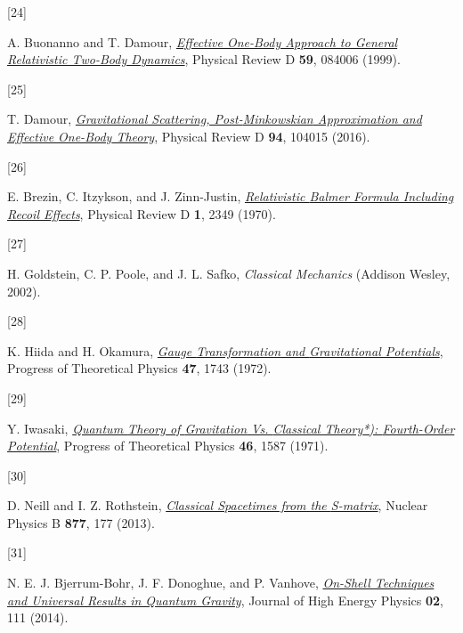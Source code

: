 \documentclass[
  10pt,
  a4paper,
  DIV=11,
  numbers=noendperiod,
  twoside]{scrreprt}
\newlength{\cslhangindent}
\newlength{\csllabelwidth}
\newlength{\cslentryspacingunit} %
\newenvironment{CSLReferences}[2] %
 {%
  \setlength{\parindent}{0pt}
  \ifodd #1
  \let\oldpar\par
  \def\par{\hangindent=\cslhangindent\oldpar}
  \fi
  \setlength{\parskip}{#2\cslentryspacingunit}
 }%
 {}
\newcommand{\CSLLeftMargin}[1]{\parbox[t]{\csllabelwidth}{#1}}
\newcommand{\CSLRightInline}[1]{\parbox[t]{\linewidth - \csllabelwidth}{#1}\break}
\DeclareRobustCommand{\[}{\begin{equation}}
\DeclareRobustCommand{\]}{\end{equation}}
\begin{document}
\begin{CSLReferences}{0}{0}
\leavevmode{}%
\CSLLeftMargin{{[}24{]} }%
\CSLRightInline{A. Buonanno and T. Damour,
\emph{\href{https://doi.org/10.1103/PhysRevD.59.084006}{Effective
One-Body Approach to General Relativistic Two-Body Dynamics}}, Physical
Review D \textbf{59}, 084006 (1999).}

\leavevmode{}%
\CSLLeftMargin{{[}25{]} }%
\CSLRightInline{T. Damour,
\emph{\href{https://doi.org/10.1103/PhysRevD.94.104015}{Gravitational
Scattering, Post-{Minkowskian} Approximation and {Effective One-Body}
Theory}}, Physical Review D \textbf{94}, 104015 (2016).}

\leavevmode{}%
\CSLLeftMargin{{[}26{]} }%
\CSLRightInline{E. Brezin, C. Itzykson, and J. Zinn-Justin,
\emph{\href{https://doi.org/10.1103/PhysRevD.1.2349}{Relativistic
{Balmer Formula Including Recoil Effects}}}, Physical Review D
\textbf{1}, 2349 (1970).}

\leavevmode{}%
\CSLLeftMargin{{[}27{]} }%
\CSLRightInline{H. Goldstein, C. P. Poole, and J. L. Safko,
\emph{Classical {Mechanics}} ({Addison Wesley}, 2002).}

\leavevmode{}%
\CSLLeftMargin{{[}28{]} }%
\CSLRightInline{K. Hiida and H. Okamura,
\emph{\href{https://doi.org/10.1143/PTP.47.1743}{Gauge {Transformation}
and {Gravitational Potentials}}}, Progress of Theoretical Physics
\textbf{47}, 1743 (1972).}

\leavevmode{}%
\CSLLeftMargin{{[}29{]} }%
\CSLRightInline{Y. Iwasaki,
\emph{\href{https://doi.org/10.1143/PTP.46.1587}{Quantum {Theory} of
{Gravitation} Vs. {Classical Theory}*): {Fourth-Order Potential}}},
Progress of Theoretical Physics \textbf{46}, 1587 (1971).}

\leavevmode{}%
\CSLLeftMargin{{[}30{]} }%
\CSLRightInline{D. Neill and I. Z. Rothstein,
\emph{\href{https://doi.org/10.1016/j.nuclphysb.2013.09.007}{Classical
Space\textendash times from the {S-matrix}}}, Nuclear Physics B
\textbf{877}, 177 (2013).}

\leavevmode{}%
\CSLLeftMargin{{[}31{]} }%
\CSLRightInline{N. E. J. Bjerrum-Bohr, J. F. Donoghue, and P. Vanhove,
\emph{\href{https://doi.org/10.1007/JHEP02(2014)111}{On-Shell Techniques
and Universal Results in Quantum Gravity}}, Journal of High Energy
Physics \textbf{02}, 111 (2014).}


\end{CSLReferences}
\end{document}
